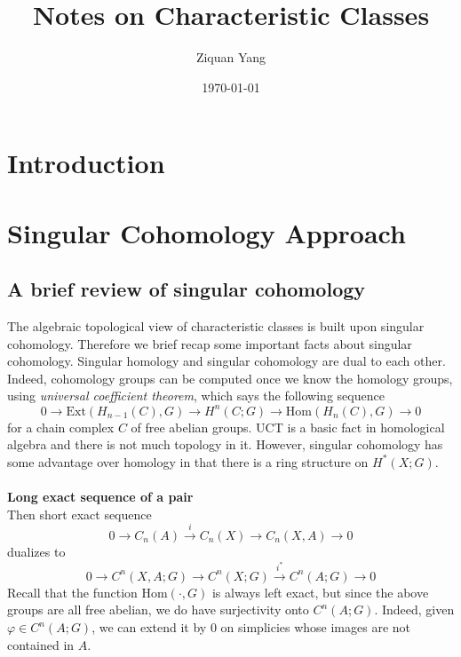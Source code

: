\documentclass[12pt]{article}
\theoremstyle{plain}
\theoremstyle{definition}
\newcommand{\Hom}{\mathrm{Hom}}
\newcommand{\<}{\langle}
\renewcommand{\>}{\rangle}
\newcommand{\Ext}{\mathrm{Ext}}
\begin{document}
\title{Notes on Characteristic Classes}
\author{Ziquan Yang}


\date{\today}

\maketitle
 
\tableofcontents

\section{Introduction}

\section{Singular Cohomology Approach}
\subsection{A brief review of singular cohomology}

The algebraic topological view of characteristic classes is built upon singular cohomology. Therefore we brief recap some important facts about singular cohomology. Singular homology and singular cohomology are dual to each other. Indeed, cohomology groups can be computed once we know the homology groups, using \textit{universal coefficient theorem}, which says the following sequence 
$$ 0 \to \Ext(H_{n - 1}(C), G) \to H^n(C; G) \to \Hom(H_n(C), G) \to 0 $$
for a chain complex $C$ of free abelian groups. UCT is a basic fact in homological algebra and there is not much topology in it. However, singular cohomology has some advantage over homology in that there is a ring structure on $H^*(X; G)$.  \\\\
\textbf{Long exact sequence of a pair}\\
Then short exact sequence 
$$ 0 \to C_n(A) \stackrel{i}{\to} C_n(X) \to C_n(X, A) \to 0 $$
dualizes to 
$$ 0 \to C^n(X, A; G) \to C^n(X; G) \stackrel{i^*}{\to} C^n(A; G) \to 0 $$
Recall that the function $\Hom(\cdot, G)$ is always left exact, but since the above groups are all free abelian, we do have surjectivity onto $C^n(A; G)$. Indeed, given $\varphi \in C^n(A; G)$, we can extend it by $0$ on simplicies whose images are not contained in $A$. 
\end{document}

